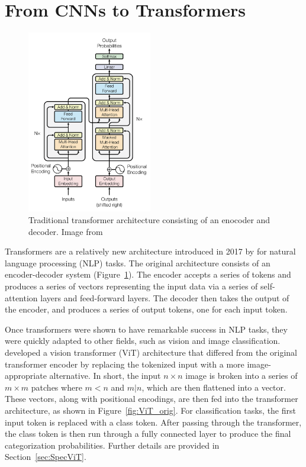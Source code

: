 \section{From CNNs to Transformers}\label{sec:transformers}
\begin{figure}[t]
    \centering
    \includegraphics[height=8cm]{figures/transformer_paper/Transformer_Original.png}
    \caption[Transformer Architecture]{Traditional transformer architecture consisting of an enocoder and decoder. 
        Image from \textcite{vaswani2017}
    \label{fig:transformer_orig}}
\end{figure}
Transformers are a relatively new architecture introduced in 2017 by \textcite{vaswani2017}
for natural language processing (NLP) tasks. The original architecture consists of 
an encoder-decoder system (Figure~\ref{fig:transformer_orig}). The encoder accepts a series of tokens and produces a series of vectors
representing the input data via a series 
of self-attention layers and feed-forward layers. The decoder then takes the output of the encoder, and
produces a series of output tokens, one for each input token. 


Once transformers were shown to have remarkable success in NLP tasks, they were 
quickly adapted to other fields, such as vision and image classification.
\textcite{dosovitskiy2020} developed a vision transformer (ViT) architecture 
that differed from the original transformer encoder by replacing the tokenized 
input with a more image-appropriate alternative. In short, 
the input $n\times n$ image is broken into a series of $m\times m$ patches where 
$m<n$ and $m|n$, which are then flattened into
a vector. These vectors, along with positional encodings, are then fed into the
transformer architecture, as shown in Figure~\ref{fig:ViT_orig}. For classification tasks, the first input token is 
replaced with a class token. After passing through the transformer, the class token 
is then run through a fully connected layer to produce the final categorization probabilities. 
Further details are provided in Section~\ref{sec:SpecViT}. 

